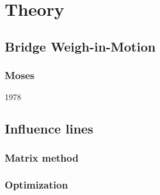 \section{Theory}

\subsection{Bridge Weigh-in-Motion}

\subsubsection{Moses}
1978
\subsection{Influence lines}

\subsubsection{Matrix method}

\subsubsection{Optimization}

